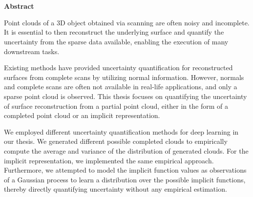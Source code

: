 \documentclass{thesis}
\begin{document}
\makeFrontMatter

\chapter*{}
\begin{center}
    \textbf{Abstract}\\
\end{center}
Point clouds of a 3D object obtained via scanning are often noisy and incomplete. It is essential to then reconstruct the underlying surface and quantify the uncertainty from the sparse data available, enabling the execution of many downstream tasks.

Existing methods have provided uncertainty quantification for reconstructed surfaces from complete scans by utilizing normal information. However, normals and complete scans are often not available in real-life applications, and only a sparse point cloud is observed. This thesis focuses on quantifying the uncertainty of surface reconstruction from a partial point cloud, either in the form of a completed point cloud or an implicit representation.

We employed different uncertainty quantification methods for deep learning in our thesis. We generated different possible completed clouds to empirically compute the average and variance of the distribution of generated clouds. For the implicit representation, we implemented the same empirical approach. Furthermore, we attempted to model the implicit function values as observations of a Gaussian process to learn a distribution over the possible implicit functions, thereby directly quantifying uncertainty without any empirical estimation.

\mainmatter













\begin{appendices}

\end{appendices}
\cleardoublepage

\backmatter
{}
{}
\begingroup
\setlength{\emergencystretch}{8em}
\printbibliography{}
\endgroup

\cleardoublepage
{}
{}
\printindex
\cleardoublepage
\end{document}
